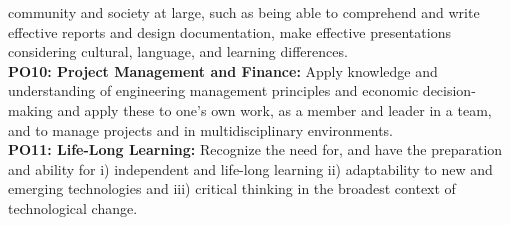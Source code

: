 \begin{tcolorbox}
{	community and society at large, such as being able to comprehend and write effective
	reports and design documentation, make effective presentations considering cultural,
	language, and learning differences.\\
	\textbf{PO10: Project Management and Finance: }Apply knowledge and understanding of
	engineering management principles and economic decision-making and apply these to
	one’s own work, as a member and leader in a team, and to manage projects and in
	multidisciplinary environments.\\
	\textbf{PO11: Life-Long Learning:} Recognize the need for, and have the preparation and ability for
	i) independent and life-long learning ii) adaptability to new and emerging technologies
	and iii) critical thinking in the broadest context of technological change.
}
\end{tcolorbox}


\begin{tcolorbox}[enhanced,width=14cm, attach boxed title to top center={yshift=-3mm,yshifttext=-1mm},
	colback=blue!5!white,colframe=gray!75!black,colbacktitle=gray!90!black,
	title=\large Program Specific Outcomes (PSOs),fonttitle=\bfseries,
	boxed title style={size=small,colframe=blue!90!black}]
	\DepartmentPSOs
\end{tcolorbox}



\clearpage
